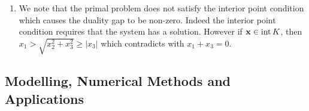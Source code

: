 \begin{enumerate}
\begin{enumerate}[label=(\arabic*)]
                    Now take any feasible point for the dual. Since \(\begin{pmatrix}
                        -y_2 \\ -1 - y_1 \\ -y_2 \\ -y_1
                    \end{pmatrix} \in \SOC^3\) we have
                    \begin{align*}
                        -y_2 \geq \sqrt{(-1 - y_1)^2 + (-y_2)^2} \\
                        (-y_2)^2 \geq (-1 - y_1)^2 + (-y)^2      \\
                        y_1 = -1.
                    \end{align*}
                    So optimal value is -1 since for any feasible point \(y_1 = -1\). Thus duality gap is optimal value of primal - optimal value of dual gives \(0 - (-1) = 1\).
              \item We note that the primal problem does not satisfy the interior point condition which causes the duality gap to be non-zero. Indeed the interior point condition requires that the system has a solution. However if \(\mathbf{x} \in \operatorname{int} K\), then \(x_1 > \sqrt{x_2^2 + x_3^2} \geq |x_3|\) which contradicts with \(x_1 + x_3 = 0\).
          \end{enumerate}
\end{enumerate}

\subsection{Modelling, Numerical Methods and Applications}

